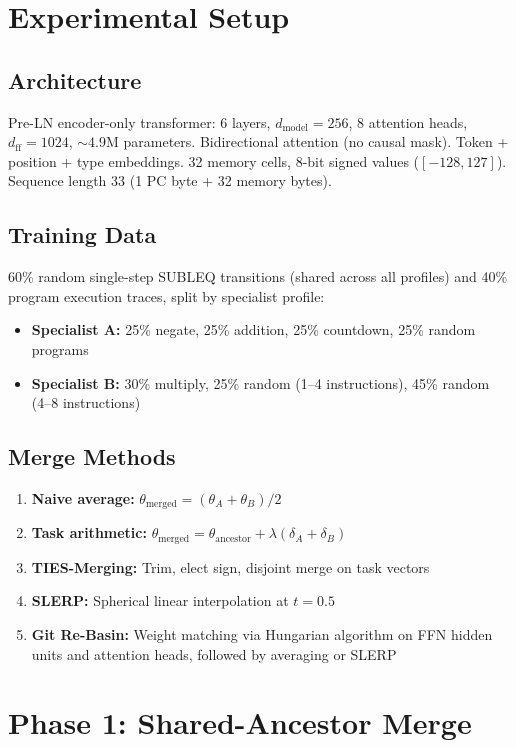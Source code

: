 \documentclass[11pt,a4paper]{article}
\begin{document}
\section{Experimental Setup}

\subsection{Architecture}
Pre-LN encoder-only transformer: 6 layers, $d_\text{model}{=}256$, 8 attention heads, $d_\text{ff}{=}1024$, ${\sim}4.9$M parameters. Bidirectional attention (no causal mask). Token + position + type embeddings. 32 memory cells, 8-bit signed values ($[-128, 127]$). Sequence length 33 (1 PC byte + 32 memory bytes).

\subsection{Training Data}
60\% random single-step SUBLEQ transitions (shared across all profiles) and 40\% program execution traces, split by specialist profile:
\begin{itemize}
    \item \textbf{Specialist A:} 25\% negate, 25\% addition, 25\% countdown, 25\% random programs
    \item \textbf{Specialist B:} 30\% multiply, 25\% random (1--4 instructions), 45\% random (4--8 instructions)
\end{itemize}

\subsection{Merge Methods}
\begin{enumerate}
    \item \textbf{Naive average:} $\theta_\text{merged} = (\theta_A + \theta_B) / 2$
    \item \textbf{Task arithmetic:} $\theta_\text{merged} = \theta_\text{ancestor} + \lambda(\delta_A + \delta_B)$
    \item \textbf{TIES-Merging:} Trim, elect sign, disjoint merge on task vectors
    \item \textbf{SLERP:} Spherical linear interpolation at $t{=}0.5$
    \item \textbf{Git Re-Basin:} Weight matching via Hungarian algorithm on FFN hidden units and attention heads, followed by averaging or SLERP
\end{enumerate}

\section{Phase 1: Shared-Ancestor Merge}
\end{document}
